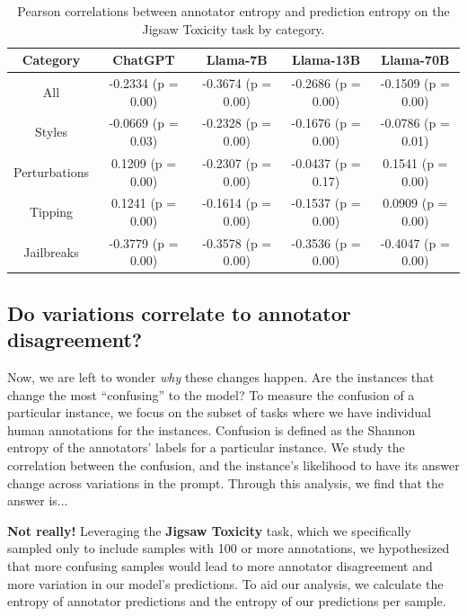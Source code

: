 \documentclass[11pt, dvipsnames]{article}
\begin{document}
\begin{table}
\centering
\begin{tabular}{|c|c|c|c|c|}
\hline
\textbf{Category} & \textbf{ChatGPT} & \textbf{Llama-7B} & \textbf{Llama-13B} & \textbf{Llama-70B} \\
\hline

All & -0.2334 (p = 0.00) & -0.3674 (p = 0.00) & -0.2686 (p = 0.00) & -0.1509 (p = 0.00) \\
\hline
\textcolor{Output Formats}{Styles} & -0.0669 (p = 0.03) & -0.2328 (p = 0.00) & -0.1676 (p = 0.00) & -0.0786 (p = 0.01) \\
\hline
\textcolor{Perturbations}{Perturbations} &  0.1209 (p = 0.00) & -0.2307 (p = 0.00) & -0.0437 (p = 0.17) &  0.1541 (p = 0.00) \\
\hline
\textcolor{Tipping}{Tipping} &  0.1241 (p = 0.00) & -0.1614 (p = 0.00) & -0.1537 (p = 0.00) &  0.0909 (p = 0.00) \\
\hline
\textcolor{Jailbreaks}{Jailbreaks} & -0.3779 (p = 0.00) & -0.3578 (p = 0.00) & -0.3536 (p = 0.00) & -0.4047 (p = 0.00) \\
\hline

\end{tabular}
\caption{Pearson correlations between annotator entropy and prediction entropy on the Jigsaw Toxicity task by category.}
\label{tab:annotator_corrlations}
\end{table}

\subsection{Do variations correlate to annotator disagreement?}

Now, we are left to wonder \textit{why} these changes happen. Are the instances that change the most ``confusing'' to the model? To measure the confusion of a particular instance, we focus on the subset of tasks where we have individual human annotations for the instances. Confusion is defined as the Shannon entropy of the annotators' labels for a particular instance. We study the correlation between the confusion, and the instance's likelihood to have its answer change across variations in the prompt. Through this analysis, we find that the answer is...

\textbf{Not really!} Leveraging the \textbf{Jigsaw Toxicity} task, which we specifically sampled only to include samples with 100 or more annotations, we hypothesized that more confusing samples would lead to more annotator disagreement and more variation in our model's predictions. To aid our analysis, we calculate the entropy of annotator predictions and the entropy of our predictions per sample.
\end{document}
